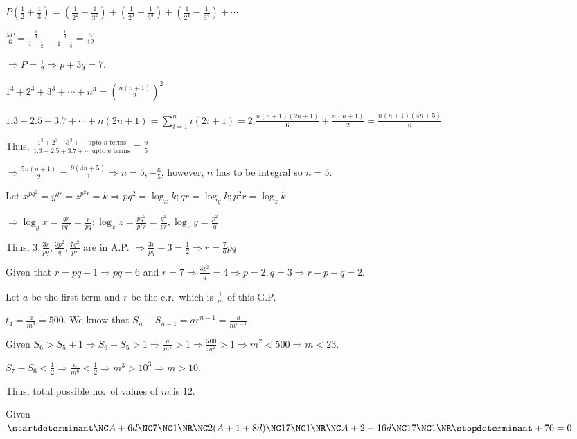   $P\left(\frac{1}{2} + \frac{1}{3}\right) = \left(\frac{1}{2^2} - \frac{1}{3^2}\right)
  + \left(\frac{1}{2^3} - \frac{1}{3^3}\right) + \left(\frac{1}{2^4} - \frac{1}{3^4}\right) + \cdots$

  $\frac{5P}{6} = \frac{\frac{1}{4}}{1 - \frac{1}{2}} - \frac{\frac{1}{9}}{1 - \frac{1}{3}} = \frac{5}{12}$

  $\Rightarrow P = \frac{1}{2}\Rightarrow p + 3q = 7$.
\item $1^3 + 2^3 + 3^3 + \cdots + n^3 = \left(\frac{n(n + 1)}{2}\right)^2$

  $1.3 + 2.5 + 3.7 + \cdots + n(2n + 1) = \displaystyle\sum_{i = 1}^ni(2i + 1) = 2.\frac{n(n + 1)(2n +
  1)}{6} + \frac{n(n + 1)}{2} = \frac{n(n + 1)(4n + 5)}{6}$

  Thus, $\frac{1^3 + 2^3 + 3^3 + \cdots \mathrm{\;upto\;} n \mathrm{\;terms}}{1.3 + 2.5 + 3.7
    + \cdots \mathrm{\;upto\;} n \mathrm{\;terms}} = \frac{9}{5}$

  $\Rightarrow \frac{5n(n + 1)}{2} = \frac{9(4n + 5)}{3}\Rightarrow n = 5, -\frac{6}{5}$, however, $n$ has
  to be integral so $n = 5$.
\item Let $x^{pq^2} = y^{qr} = z^{p^2r} = k \Rightarrow pq^2 = \log_xk; qr = \log_yk; p^2r = \log_zk$

  $\Rightarrow \log_yx = \frac{qr}{pq^2} = \frac{r}{pq}; \log_xz = \frac{pq^2}{p^2r}
  = \frac{q^2}{pr}, \log_zy = \frac{p^2}{q}$

  Thus, $3, \frac{3r}{pq}, \frac{3p^2}{q}, \frac{7q^2}{pr}$ are in A.P. $\Rightarrow \frac{3r}{pq} - 3
  = \frac{1}{2}\Rightarrow r = \frac{7}{6}pq$

  Given that $r = pq + 1 \Rightarrow pq = 6$ and $r = 7 \Rightarrow \frac{3p^2}{q} = 4 \Rightarrow p = 2, q
  = 3\Rightarrow r - p - q = 2$.
\item Let $a$ be the first term and $r$ be the c.r.\ which is $\frac{1}{m}$ of this G.P.

  $t_4 = \frac{a}{m^3} = 500$. We know that $S_n - S_{n - 1} = ar^{n - 1} = \frac{a}{m^{n - 1}}$.

  Given $S_6 > S_5 + 1 \Rightarrow S_6 - S_5 > 1 \Rightarrow \frac{a}{m^5} > 1 \Rightarrow \frac{500}{m^2} >
  1 \Rightarrow m^2 < 500 \Rightarrow m < 23$.

  $S_7 - S_6 < \frac{1}{2}\Rightarrow \frac{a}{m^6} < \frac{1}{2}\Rightarrow m^3 > 10^3 \Rightarrow m > 10$.

  Thus, total possible no.\ of values of $m$ is $12$.
\item Given $\startdeterminant\NC A + 6d\NC 7\NC 1\NR\NC 2(A + 1 + 8d)\NC 17\NC 1\NR\NC A + 2 + 16d\NC
  17\NC 1\NR\stopdeterminant + 70 = 0$

